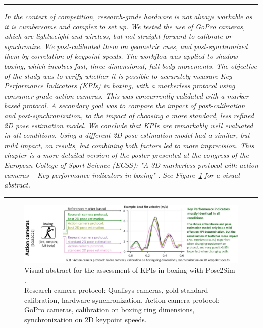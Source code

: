 \begin{center}
\rule{0.7\linewidth}{.5pt}
\begin{minipage}{0.7\linewidth}
\smallskip

\textit{In the context of competition, research-grade hardware is not always workable as it is cumbersome and complex to set up. We tested the use of GoPro cameras, which are lightweight and wireless, but not straight-forward to calibrate or synchronize. We post-calibrated them on geometric cues, and post-synchronized them by correlation of keypoint speeds. The workflow was applied to shadow-boxing, which involves fast, three-dimensional, full-body movements. \newline\newline
The objective of the study was to verify whether it is possible to accurately measure Key Performance Indicators (KPIs) in boxing, with a markerless protocol using consumer-grade action cameras. This was concurrently validated with a marker-based protocol. A secondary goal was to compare the impact of post-calibration and post-synchronization, to the impact of choosing a more standard, less refined 2D pose estimation model. We conclude that KPIs are remarkably well evaluated in all conditions. Using a different 2D pose estimation model had a similar, but mild impact, on results, but combining both factors led to more imprecision.\newline \newline
This chapter is a more detailed version of the poster presented at the congress of the European College of Sport Science (ECSS): "A 3D markerless protocol with action cameras – Key performance indicators in boxing" \cite{Pagnon2022c}. See Figure~\ref{fig_visabstract4} for a visual abstract.
}

\end{minipage}
\smallskip
\rule{0.7\linewidth}{.5pt}
\end{center}

\clearpage

\minitoc

\vspace*{3cm}

\begin{figure}[hbtp]
	\centering
      \captionsetup{justification=centering}
	\def\svgwidth{1\columnwidth}
	\fontsize{10pt}{10pt}\selectfont
	\includegraphics[width=\linewidth]{"../Intro/Figures/Fig_VisAbstract4.JPG"}
      \caption{Visual abstract for the assessment of KPIs in boxing with Pose2Sim \cite{Pagnon2022c}. \\Research camera protocol: Qualisys cameras, gold-standard calibration, hardware synchronization. Action camera protocol: GoPro cameras, calibration on boxing ring dimensions, synchronization on 2D keypoint speeds.}
	\label{fig_visabstract4}
\end{figure}


